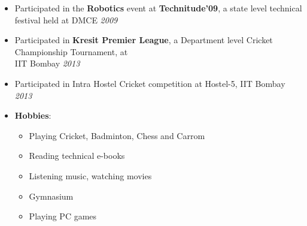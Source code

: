 \begin{itemize}
	\item Participated in the \textbf{Robotics} event at \textbf{Technitude'09}, a state level technical festival held at DMCE \hfill \emph{2009} \\[-0.6cm]
	\item Participated in \textbf{Kresit Premier League}, a Department level Cricket Championship Tournament, at \\ IIT Bombay \hfill \emph{2013} \\[-0.6cm]
	\item Participated in Intra Hostel Cricket competition at Hostel-5, IIT Bombay \hfill \emph{2013} \\[-0.6cm]
	\item \textbf{Hobbies}: \hfill \\[-0.6cm]
	\begin{itemize}
		\item Playing Cricket, Badminton, Chess and Carrom \\[-0.5cm]
		\item Reading technical e-books \\[-0.5cm]
		\item Listening music, watching movies \\[-0.5cm]
		\item Gymnasium \\[-0.5cm]
		\item Playing PC games
	\end{itemize}
\end{itemize}
